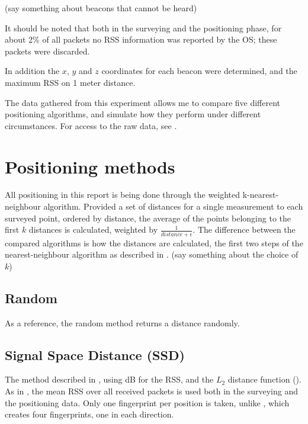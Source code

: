 (say something about beacons that cannot be heard)

It should be noted that both in the surveying and the positioning phase, for about 2\% of all packets no RSS information was reported by the OS; these packets were discarded.

In addition the $x$, $y$ and $z$ coordinates for each beacon were determined, and the maximum RSS on 1 meter distance.

The data gathered from this experiment allows me to compare five different positioning algorithms, and simulate how they perform under different circumstances.
For access to the raw data, see .

\section{Positioning methods}

All positioning in this report is being done through the weighted k-nearest-neighbour algorithm.
Provided a set of distances for a single measurement to each surveyed point, ordered by distance, the average of the points belonging to the first $k$ distances is calculated, weighted by $\frac{1}{distance+\epsilon}$.
The difference between the compared algorithms is how the distances are calculated, the first two steps of the nearest-neighbour algorithm as described in .
(say something about the choice of $k$)

\subsection{Random}
As a reference, the random method returns a distance randomly.

\subsection{Signal Space Distance (SSD)}
The method described in \citet{bahl2000radar}, using dB for the RSS, and the $L_2$ distance function ().
As in \citet{bahl2000radar}, the mean RSS over all received packets is used both in the surveying and the positioning data.
Only one fingerprint per position is taken, unlike \citet{bahl2000radar}, which creates four fingerprints, one in each direction.

